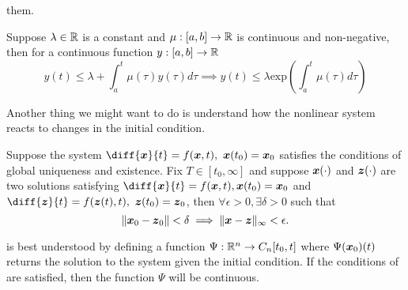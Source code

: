 them.
\begin{theorem}
	Suppose $\lambda\in\mathbb{R}$ is a constant and $\mu:[a,b]\to\mathbb{R}$ is continuous and
	non-negative, then for a continuous function $y:[a, b]\to\mathbb{R}$ \[
		y(t) \leq \lambda + \int_a^t \mu(\tau)y(\tau)d\tau \implies y(t) \leq
		\lambda \text{exp}\left(\int_a^t\mu(\tau)d\tau\right)
	\]
	\label{thm:bellman-gronwall}
\end{theorem}
Another thing we might want to do is understand how the nonlinear system reacts
to changes in the initial condition.
\begin{theorem}
	Suppose the system $\diff{\bs{x}}{t} = f(\bs{x}, t),\ \bs{x}(t_0) = \bs{x}_0$
	satisfies the conditions of global uniqueness and existence. Fix $T\in[t_0,
	\infty]$ and suppose $\boldsymbol{x}(\cdot)$ and $\boldsymbol{z}(\cdot)$  are two solutions
	satisfying $\diff{\bs{x}}{t} = f(\bs{x}, t), \bs{x}(t_0) = \bs{x}_0$ and
	$\diff{\bs{z}}{t} = f(\bs{z}(t), t),\ \bs{z}(t_0)=\bs{z}_0$, then $\forall
	\epsilon > 0, \exists \delta > 0$ such that \[
		\|\boldsymbol{x}_0 - \boldsymbol{z}_0\| < \delta \implies \|\boldsymbol{x} - \boldsymbol{z}\|_{\infty} <
		\epsilon.
	\]
	\label{thm:continuous-dependence-on-ic}
\end{theorem}
 is best understood by defining a function
$\Psi:\mathbb{R}^n \to C_n[t_0, t]$ where $\Psi(\boldsymbol{x}_0)(t)$ returns the solution to
the system given the initial condition. If the conditions of
 are satisfied, then the function $\Psi$
will be continuous.

